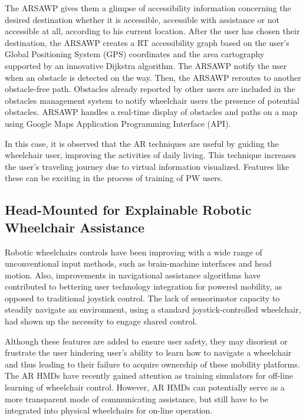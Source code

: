 The ARSAWP gives them a glimpse of accessibility information concerning the desired destination whether it is accessible, accessible with assistance or not accessible at all, according to his current location. After the user has chosen their destination, the ARSAWP creates a RT accessibility graph based on the user’s Global Positioning System (GPS) coordinates and the area cartography supported by an innovative Dijkstra algorithm. The ARSAWP notify the user when an obstacle is detected on the way. Then, the ARSAWP reroutes to another obstacle-free path. Obstacles already reported by other users are included in the obstacles management system to notify wheelchair users the presence of potential obstacles. ARSAWP handles a real-time display of obstacles and paths on a map using Google Maps Application Programming Interface (API).

In this case, it is observed that the AR techniques are useful by guiding the wheelchair user, improving the activities of daily living. This technique increases the user's traveling journey due to virtual information visualized. Features like these can be exciting in the process of training of PW users.

\subsection{Head-Mounted for Explainable Robotic Wheelchair Assistance}

Robotic wheelchairs controls have been improving with a wide range of unconventional input methods, such as brain-machine interfaces and head motion. Also, improvements in navigational assistance algorithms have contributed to bettering user technology integration for powered mobility, as opposed to traditional joystick control. The lack of sensorimotor capacity to steadily navigate an environment, using a standard joystick-controlled wheelchair, had shown up the necessity to engage shared control.

Although these features are added to ensure user safety, they may disorient or frustrate the user hindering user’s ability to learn how to navigate a wheelchair and thus leading to their failure to acquire ownership of these mobility platforms. The AR HMDs have recently gained attention as training simulators for off-line learning of wheelchair control. However, AR HMDs can potentially serve as a more transparent mode of communicating assistance, but still have to be integrated into physical wheelchairs for on-line operation. 

